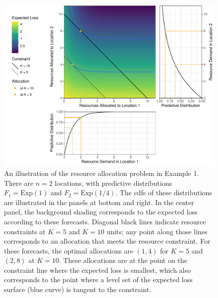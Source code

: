 \documentclass{article}
\begin{document}
\begin{figure}
    \includegraphics[width=\textwidth]{../figures/exponential_pred_expected_loss.pdf}
    \caption{An illustration of the resource allocation problem in Example 1. There are $n = 2$ locations, with predictive distributions $F_1 = \mathrm{Exp}(1)$ and $F_2 = \mathrm{Exp}(1/4)$. The cdfs of these distributions are illustrated in the panels at bottom and right. In the center panel, the background shading corresponds to the expected loss according to these forecasts. Diagonal black lines indicate resource constraints at $K=5$ and $K=10$ units; any point along those lines corresponds to an allocation that meets the resource constraint. For these forecasts, the optimal allocations are $(1, 4)$ for $K=5$ and $(2, 8)$ at $K=10$. These allocations are at the point on the constraint line where the expected loss is smallest, which also corresponds to the point where a level set of the expected loss surface (blue curve) is tangent to the constraint.}
    \label{fig:exp_alloc_example}
\end{figure}
\end{document}
